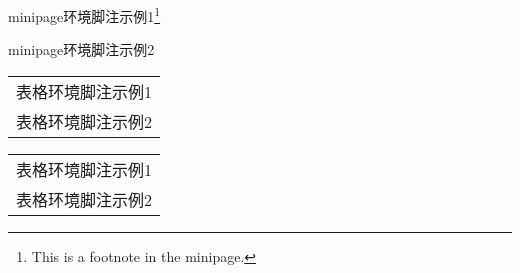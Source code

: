            \begin{minipage}{\linewidth}
                minipage环境脚注示例1\footnote{This is a footnote in the minipage.} %

                minipage环境脚注示例2\footnotemark %
            \end{minipage}

            \begin{tabular}{l}
                表格环境脚注示例1\footnotemark\\
                表格环境脚注示例2\footnotemark
            \end{tabular}

            \begin{tabular}{l}
                表格环境脚注示例1\footnotemark\\
                表格环境脚注示例2\footnotemark
            \end{tabular}
            \addtocounter{footnote}{-2}
            

